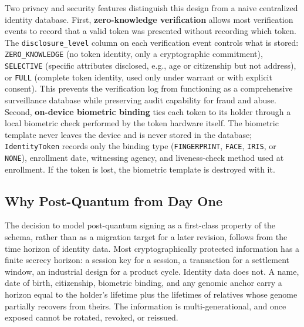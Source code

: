 \documentclass[11pt,letterpaper]{article}
\newcommand{\entity}[1]{\texttt{\color{navydark}#1}}
\begin{document}
Two privacy and security features distinguish this design from a naive centralized identity database. First, \textbf{zero-knowledge verification} allows most verification events to record that a valid token was presented without recording which token. The \texttt{disclosure\_level} column on each verification event controls what is stored: \texttt{ZERO\_KNOWLEDGE} (no token identity, only a cryptographic commitment), \texttt{SELECTIVE} (specific attributes disclosed, e.g., age or citizenship but not address), or \texttt{FULL} (complete token identity, used only under warrant or with explicit consent). This prevents the verification log from functioning as a comprehensive surveillance database while preserving audit capability for fraud and abuse. Second, \textbf{on-device biometric binding} ties each token to its holder through a local biometric check performed by the token hardware itself. The biometric template never leaves the device and is never stored in the database; \entity{IdentityToken} records only the binding type (\texttt{FINGERPRINT}, \texttt{FACE}, \texttt{IRIS}, or \texttt{NONE}), enrollment date, witnessing agency, and liveness-check method used at enrollment. If the token is lost, the biometric template is destroyed with it.

\subsection{Why Post-Quantum from Day One}
\label{subsec:pq-day-one}

The decision to model post-quantum signing as a first-class property of the schema, rather than as a migration target for a later revision, follows from the time horizon of identity data. Most cryptographically protected information has a finite secrecy horizon: a session key for a session, a transaction for a settlement window, an industrial design for a product cycle. Identity data does not. A name, date of birth, citizenship, biometric binding, and any genomic anchor carry a horizon equal to the holder's lifetime plus the lifetimes of relatives whose genome partially recovers from theirs. The information is multi-generational, and once exposed cannot be rotated, revoked, or reissued.
\end{document}
